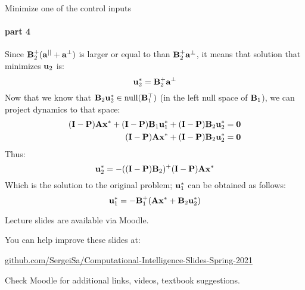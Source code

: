 \documentclass{beamer}
\begin{document}
\begin{frame}{Minimize one of the control inputs}
\framesubtitle{part 4}
\begin{flushleft}

Since $\mathbf{B}_2^+ (\mathbf{a}^{||} + \mathbf{a}^\perp)$ is larger or equal to than $\mathbf{B}_2^+ \mathbf{a}^\perp$, it means that solution that minimizes $\mathbf{u}_2$ is:
%
\begin{equation}
    \mathbf{u}_2^* = \mathbf{B}_2^+ \mathbf{a}^\perp
\end{equation}
%
Now that we know that $\mathbf{B}_2 \mathbf{u}_2^* \in \text{null}(\mathbf{B}_1^\top)$ (in the left null space of $\mathbf{B}_1$), we can project dynamics to that space:
%
\begin{align*}
    (\mathbf{I} - \mathbf{P})\mathbf{A} \mathbf{x}^* + (\mathbf{I} - \mathbf{P})\mathbf{B}_1 \mathbf{u}_1^* + (\mathbf{I} - \mathbf{P})\mathbf{B}_2 \mathbf{u}_2^* = \mathbf{0} \\
    (\mathbf{I} - \mathbf{P})\mathbf{A} \mathbf{x}^* + (\mathbf{I} - \mathbf{P})\mathbf{B}_2 \mathbf{u}_2^* = \mathbf{0}
\end{align*}
%
Thus:
\begin{equation}
    \mathbf{u}_2^* = -((\mathbf{I} - \mathbf{P})\mathbf{B}_2)^+ (\mathbf{I} - \mathbf{P})\mathbf{A} \mathbf{x}^*
\end{equation}
%
Which is the solution to the original problem; $\mathbf{u}^*_1$ can be obtained as follows:
%
\begin{equation}
\label{Solution_u1}
      \mathbf{u}^*_1  = -\mathbf{B}^+_1(\mathbf{A} \mathbf{x}^* + \mathbf{B}_2 \mathbf{u}^*_2)
\end{equation}

\end{flushleft}
\end{frame}




\begin{frame}
\centerline{Lecture slides are available via Moodle.}
\bigskip
\centerline{You can help improve these slides at:}
\centerline{
\textcolor{blue}{\href{https://github.com/SergeiSa/Computational-Intelligence-Slides-Spring-2021}{github.com/SergeiSa/Computational-Intelligence-Slides-Spring-2021}}
}
\bigskip

\textcolor{black}{}
\bigskip


\centerline{Check Moodle for additional links, videos, textbook suggestions.}
\end{frame}
\end{document}
